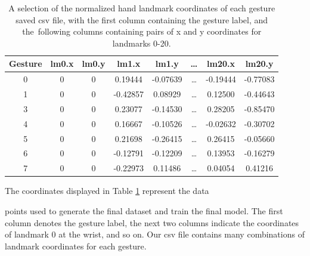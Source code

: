 \begin{table}[ht!]
	\centering
	
	\caption{A selection of the normalized hand landmark coordinates of each gesture saved csv file, with the first column containing the gesture label, and the~following columns containing pairs of x and y coordinates for landmarks 0-20.}
	\begin{tabular}{|c|c|c|c|c|c|c|c|}
		\hline
		Gesture & lm0.x & lm0.y & lm1.x & lm1.y & \ldots & lm20.x & lm20.y \\ \hline
		0       & 0     & 0     & 0.19444 & -0.07639 & \ldots & -0.19444 & -0.77083 \\ \hline
		1       & 0     & 0     & -0.42857 & 0.08929 & \ldots & 0.12500 & -0.44643 \\ \hline
		3       & 0     & 0     & 0.23077 & -0.14530 & \ldots & 0.28205 & -0.85470 \\ \hline
		4       & 0     & 0     & 0.16667 & -0.10526 & \ldots & -0.02632 & -0.30702 \\ \hline
		5       & 0     & 0     & 0.21698 & -0.26415 & \ldots & 0.26415 & -0.05660 \\ \hline
		6       & 0     & 0     & -0.12791 & -0.12209 & \ldots & 0.13953 & -0.16279 \\ \hline
		7       & 0     & 0     & -0.22973 & 0.11486 & \ldots & 0.04054 & 0.41216 \\ \hline
	\end{tabular}

	\label{tab:saved_csv}
\end{table}





The coordinates displayed in Table \ref{tab:saved_csv} represent the data

points used to generate the final dataset and train the final model. The first column denotes the gesture label, the next two columns indicate the coordinates of landmark 0 at the wrist, and so on. Our csv file contains many combinations of landmark coordinates for each gesture.



